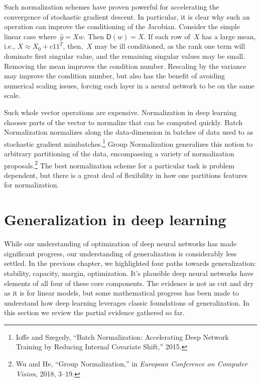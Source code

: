\documentclass{tufte-book}
\begin{document}
Such normalization schemes have proven powerful for accelerating the
convergence of stochastic gradient descent. In particular, it is clear
why such an operation can improve the conditioning of the Jacobian.
Consider the simple linear case where~\(\hat{y} = Xw\). Then
\(\mathsf{D} (w) = X\). If each row of~\(X\) has a large mean, i.e.,
\(X \approx X_0 + c11^T\), then,~\(X\) may be ill conditioned, as the
rank one term will dominate first singular value, and the remaining
singular values may be small. Removing the mean improves the condition
number. Rescaling by the variance may improve the condition number, but
also has the benefit of avoiding numerical scaling issues, forcing each
layer in a neural network to be on the same scale.

Such whole vector operations are expensive. Normalization in deep
learning chooses parts of the vector to normalize that can be computed
quickly. Batch Normalization normalizes along the data-dimension in
batches of data used to as stochastic gradient minibatches.\footnote{Ioffe
  and Szegedy, {``Batch Normalization: Accelerating Deep Network
  Training by Reducing Internal Covariate Shift,''} 2015.} Group
Normalization generalizes this notion to arbitrary partitioning of the
data, encompassing a variety of normalization proposals.\footnote{Wu and
  He, {``Group Normalization,''} in \emph{European Conference on
  Computer Vision}, 2018, 3--19.} The best normalization scheme for a
particular task is problem dependent, but there is a great deal of
flexibility in how one partitions features for normalization.

\hypertarget{generalization-in-deep-learning}{%
\section{Generalization in deep
learning}\label{generalization-in-deep-learning}}

While our understanding of optimization of deep neural networks has made
significant progress, our understanding of generalization is
considerably less settled. In the previous chapter, we highlighted four
paths towards generalization: stability, capacity, margin, optimization.
It's plausible deep neural networks have elements of all four of these
core components. The evidence is not as cut and dry as it is for linear
models, but some mathematical progress has been made to understand how
deep learning leverages classic foundations of generalization. In this
section we review the partial evidence gathered so far.
\end{document}
